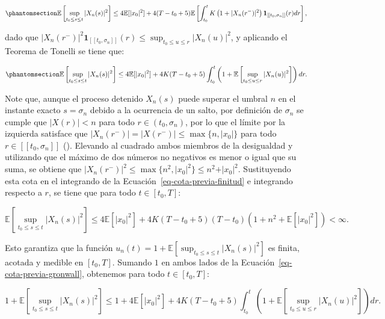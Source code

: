 \documentclass[
  spanish,
  us-letterpaper,
]{scrreprt}
\numberwithin{equation}{section}
\theoremstyle{plain}
\theoremstyle{plain}
\theoremstyle{plain}
\theoremstyle{definition}
\theoremstyle{remark}
\begin{document}
\begin{equation}\phantomsection\label{eq-cota-previa-finitud}{
\mathbb{E}\left[ \sup_{t_0 \le s \le t} \vert X_n(s) \vert^2 \right] \le 4\mathbb{E}[\vert x_0 \vert^2] + 4(T - t_0 + 5)\mathbb{E}\left[ \int_{t_0}^t K\left( 1 + \vert X_n(r^-) \vert^2 \right) \mathbf{1}_{[[t_0, \sigma_n]]}(r) dr \right],
}\end{equation}

dado que
\(\displaystyle \vert X_n(r^-) \vert^2 \mathbf{1}_{[[t_0, \sigma_n]]}(r) \le \sup_{t_0 \le u \le r} \vert X_n(u) \vert^2\),
y aplicando el Teorema de Tonelli se tiene que:

\begin{equation}\phantomsection\label{eq-cota-previa-gronwall}{
\mathbb{E}\left[ \sup_{t_0 \le s \le t} \vert X_n(s) \vert^2 \right] \le 4\mathbb{E}[\vert x_0 \vert^2] + 4K(T - t_0 + 5) \int_{t_0}^t \left( 1 + \mathbb{E}\left[ \sup_{t_0 \le u \le r} \vert X_n(u) \vert^2 \right] \right) dr.
}\end{equation}

Note que, aunque el proceso detenido \(X_n(s)\) puede superar el umbral
\(n\) en el instante exacto \(s = \sigma_n\) debido a la ocurrencia de
un salto, por definición de \(\sigma_n\) se cumple que
\(\vert X(r) \vert < n\) para todo \(r \in (t_0, \sigma_n)\), por lo que
el límite por la izquierda satisface que
\(\vert X_n(r^-) \vert = \vert X(r^-) \vert \le \max\{n, \vert x_0 \vert\}\)
para todo \(r \in [[t_0, \sigma_n]]\)
(). Elevando al cuadrado ambos
miembros de la desigualdad y utilizando que el máximo de dos números no
negativos es menor o igual que su suma, se obtiene que
\(\vert X_n(r^-) \vert^2 \le \max\{n^2, \vert x_0 \vert^2\} \le n^2 + \vert x_0 \vert^2\).
Sustituyendo esta cota en el integrando de la
Ecuación~\ref{eq-cota-previa-finitud} e integrando respecto a \(r\), se
tiene que para todo \(t \in [t_0, T]\):

\[
\mathbb{E}\left[ \sup_{t_0 \le s \le t} \vert X_n(s) \vert^2 \right] \le 4\mathbb{E}[\vert x_0 \vert^2] + 4K(T - t_0 + 5)(T - t_0)\left( 1 + n^2 + \mathbb{E}[\vert x_0 \vert^2] \right) < \infty.
\]

Esto garantiza que la función
\(\displaystyle u_n(t) = 1 + \mathbb{E}\left[ \sup_{t_0 \le s \le t} \vert X_n(s) \vert^2 \right]\)
es finita, acotada y medible en \([t_0, T].\) Sumando \(1\) en ambos
lados de la Ecuación~\ref{eq-cota-previa-gronwall}, obtenemos para todo
\(t \in [t_0, T]\):

\[
1 + \mathbb{E}\left[ \sup_{t_0 \le s \le t} \vert X_n(s) \vert^2 \right] \le 1 + 4\mathbb{E}[\vert x_0 \vert^2] + 4K(T - t_0 + 5) \int_{t_0}^t \left( 1 + \mathbb{E}\left[ \sup_{t_0 \le u \le r} \vert X_n(u) \vert^2 \right] \right) dr.
\]
\end{document}
